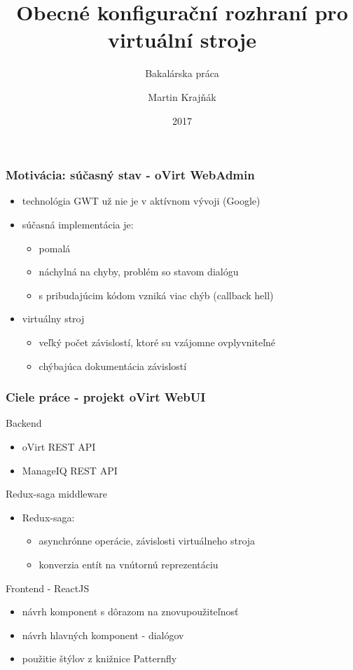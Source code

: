 \documentclass[pdf]{beamer}
\title[Obecné konfigurační rozhraní pro virtuální stroje \hspace{10mm} \insertframenumber/\inserttotalframenumber]{Obecné konfigurační rozhraní pro virtuální stroje}
\subtitle{Bakalárska práca}
\author{Martin Krajňák}
\date{2017}
\begin{document}
\begin{frame}
\titlepage
\end{frame}


\begin{frame}
\frametitle{Motivácia: súčasný stav - oVirt WebAdmin}
\begin{itemize}
\item technológia GWT už nie je v aktívnom vývoji (Google)
\item súčasná implementácia je:
\begin{itemize}
\item pomalá
\item náchylná na chyby, problém so stavom dialógu
\item s pribudajúcim kódom vzniká viac chýb (callback hell)
\end{itemize}
\item virtuálny stroj 
\begin{itemize}
\item veľký počet závislostí, ktoré su vzájomne ovplyvniteľné
\item chýbajúca dokumentácia závislostí
\end{itemize}
\end{itemize}
\end{frame}


\begin{frame}
\frametitle{Ciele práce - projekt oVirt WebUI}
\begin{block}{Backend}

\begin{itemize}
\item oVirt REST API
\item ManageIQ REST API
\end{itemize}

\end{block}

\begin{block}{Redux-saga middleware}
\begin{itemize}
\item Redux-saga:
\begin{itemize}
\item asynchrónne operácie, závislosti virtuálneho stroja
\item konverzia entít na vnútornú reprezentáciu
\end{itemize}
\end{itemize}
\end{block}

\begin{block}{Frontend - ReactJS}
\begin{itemize}
\item návrh komponent s dôrazom na znovupoužiteľnosť
\item návrh hlavných komponent - dialógov
\item použitie štýlov z knižnice Patternfly
\end{itemize}
\end{block}

\end{frame}
\end{document}
